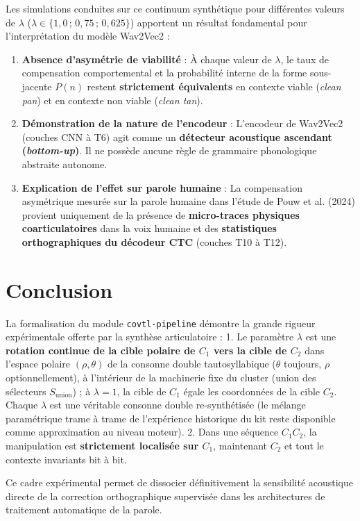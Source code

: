\documentclass[11pt,a4paper]{article}
\begin{document}
Les simulations conduites sur ce continuum synthétique pour différentes valeurs de $\lambda$ ($\lambda \in \{1{,}0\,;\, 0{,}75\,;\, 0{,}625\}$) apportent un résultat fondamental pour l'interprétation du modèle Wav2Vec2 :

\begin{enumerate}[leftmargin=*]
    \item \textbf{Absence d'asymétrie de viabilité} : À chaque valeur de $\lambda$, le taux de compensation comportemental et la probabilité interne de la forme sous-jacente $P(n)$ restent \textbf{strictement équivalents} en contexte viable (\textit{clean pan}) et en contexte non viable (\textit{clean tan}).
    \item \textbf{Démonstration de la nature de l'encodeur} : L'encodeur de Wav2Vec2 (couches CNN à T6) agit comme un \textbf{détecteur acoustique ascendant (\textit{bottom-up})}. Il ne possède aucune règle de grammaire phonologique abstraite autonome.
    \item \textbf{Explication de l'effet sur parole humaine} : La compensation asymétrique mesurée sur la parole humaine dans l'étude de Pouw et al. (2024) provient uniquement de la présence de \textbf{micro-traces physiques coarticulatoires} dans la voix humaine et des \textbf{statistiques orthographiques du décodeur CTC} (couches T10 à T12).
\end{enumerate}

\section{Conclusion}

La formalisation du module \texttt{covtl-pipeline} démontre la grande rigueur expérimentale offerte par la synthèse articulatoire :
1. Le paramètre $\lambda$ est une \textbf{rotation continue de la cible polaire de $C_1$ vers la cible de $C_2$} dans l'espace polaire $(\rho, \theta)$ de la consonne double tautosyllabique ($\theta$ toujours, $\rho$ optionnellement), à l'intérieur de la machinerie fixe du cluster (union des sélecteurs $S_{\text{union}}$) ; à $\lambda = 1$, la cible de $C_1$ égale les coordonnées de la cible $C_2$. Chaque $\lambda$ est une véritable consonne double re-synthétisée (le mélange paramétrique trame à trame de l'expérience historique du kit reste disponible comme approximation au niveau moteur).
2. Dans une séquence $C_1 C_2$, la manipulation est \textbf{strictement localisée sur $C_1$}, maintenant $C_2$ et tout le contexte invariants bit à bit.

Ce cadre expérimental permet de dissocier définitivement la sensibilité acoustique directe de la correction orthographique supervisée dans les architectures de traitement automatique de la parole.
\end{document}
